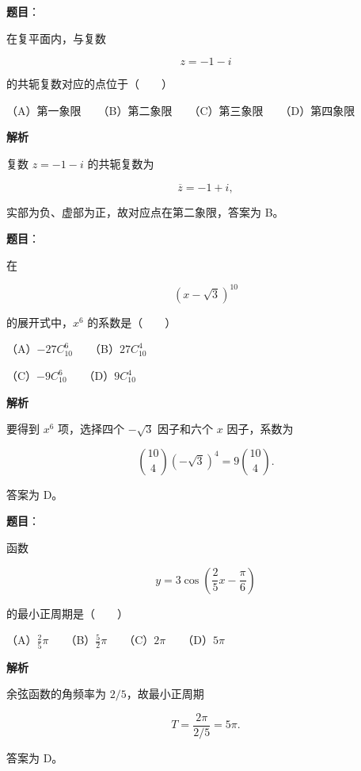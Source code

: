 \begin{answer}

\textbf{题目}：

在复平面内，与复数

\nopagebreak[4]
\[
z=-1-i
\]

的共轭复数对应的点位于\mbox{（　　）}

（A）第一象限　　（B）第二象限　　（C）第三象限　　（D）第四象限

\textbf{解析}

复数 $z=-1-i$ 的共轭复数为

\nopagebreak[4]
\[
\overline z=-1+i,
\]

实部为负、虚部为正，故对应点在第二象限，答案为 B。


\end{answer}
\begin{answer}

\textbf{题目}：

在

\nopagebreak[4]
\[
(x-\sqrt3)^{10}
\]

的展开式中，$x^6$ 的系数是\mbox{（　　）}

（A）$-27C_{10}^{6}$　　（B）$27C_{10}^{4}$

（C）$-9C_{10}^{6}$　　（D）$9C_{10}^{4}$

\textbf{解析}

要得到 $x^6$ 项，选择四个 $-\sqrt3$ 因子和六个 $x$ 因子，系数为

\nopagebreak[4]
\[
\binom{10}{4}(-\sqrt3)^4
=9\binom{10}{4}.
\]

答案为 D。


\end{answer}
\begin{answer}

\textbf{题目}：

函数

\nopagebreak[4]
\[
y=3\cos\left(\frac25x-\frac\pi6\right)
\]

的最小正周期是\mbox{（　　）}

（A）$\frac25\pi$　　（B）$\frac52\pi$　　（C）$2\pi$　　（D）$5\pi$

\textbf{解析}

余弦函数的角频率为 $2/5$，故最小正周期

\nopagebreak[4]
\[
T=\frac{2\pi}{2/5}=5\pi.
\]

答案为 D。


\end{answer}
